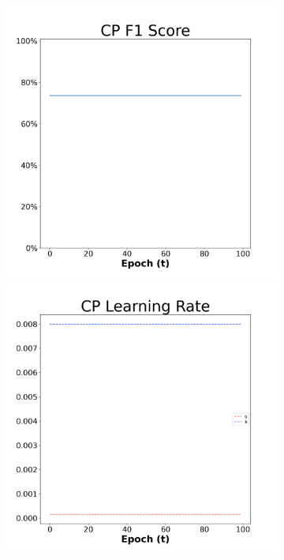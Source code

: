 \begin{figure}[H]
    \centering %
\begin{subfigure}{0.3\textwidth}
  \includegraphics[width=\linewidth]{images/exper2/Ionosphere/CP_0.01_f1.png}
    \includegraphics[width=\linewidth]{images/exper2/Ionosphere/CP_0.01_lr.png}

\end{subfigure}
\end{figure}

